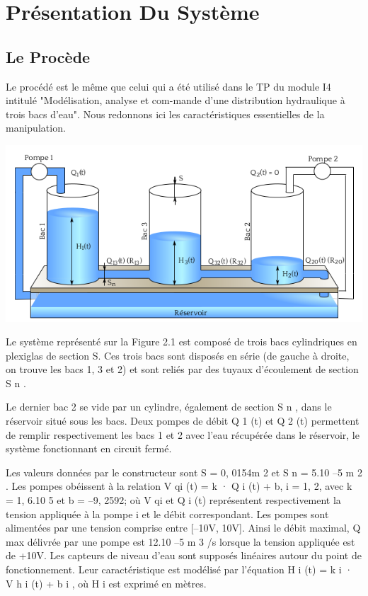 \chapter{Présentation  Du Système }

 \section{Le Procède}

      Le procédé est le même que celui qui a été utilisé dans le TP du module I4 intitulé "Modélisation, analyse et com-mande d’une distribution hydraulique à trois bacs d’eau". Nous redonnons ici les caractéristiques essentielles de la manipulation.
      
\begin{center}
\includegraphics[scale=0.5]{fig1.png}
\label{fig1} 
\end{center}

      Le système représenté sur la Figure 2.1 est composé de trois bacs cylindriques en plexiglas de section S. Ces trois bacs sont disposés en série (de gauche à droite, on trouve les bacs 1, 3 et 2) et sont reliés par des tuyaux d’écoulement de section S n .
      
      Le dernier bac 2 se vide par un cylindre, également de section S n , dans le réservoir situé sous les bacs. Deux pompes de débit Q 1 (t) et Q 2 (t) permettent de remplir respectivement les bacs 1 et 2 avec l’eau récupérée dans le réservoir, le système fonctionnant en circuit fermé.

      Les valeurs données par le constructeur sont S = 0, 0154m 2 et S n = 5.10 –5 m 2 .
      Les pompes obéissent à la relation V qi (t) = k · Q i (t) + b, i = 1, 2, avec k = 1, 6.10 5 et b = –9, 2592; où V qi et Q i (t) représentent respectivement la tension appliquée à la pompe i et le débit correspondant.
      Les pompes sont alimentées par une tension comprise entre [–10V, 10V]. Ainsi le débit maximal, Q max
délivrée par une pompe est 12.10 –5 m 3 /s lorsque la tension appliquée est de +10V. Les capteurs de niveau d’eau sont supposés linéaires autour du point de fonctionnement. Leur caractéristique est modélisé par l’équation H i (t) = k i · V h i (t) + b i , où H i est exprimé en mètres.\cite{ref1}


